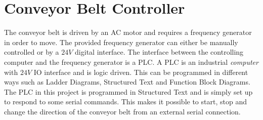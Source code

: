\section{Conveyor Belt Controller} 
\label{sec:conveyor_belt_sec}
The conveyor belt is driven by an AC motor and requires a frequency generator in order to move. The provided frequency generator can either be manually controlled or by a $24V$ digital interface. The interface between the controlling computer and the frequency generator is a PLC. A PLC is an industrial \textit{computer} with $24V$ IO interface and is logic driven. This can be programmed in different ways such as Ladder Diagrams, Structured Text and Function Block Diagrams.\\ 

The PLC in this project is programmed in Structured Text and is simply set up to respond to some serial commands. This makes it possible to start, stop and change the direction of the conveyor belt from an external serial connection.